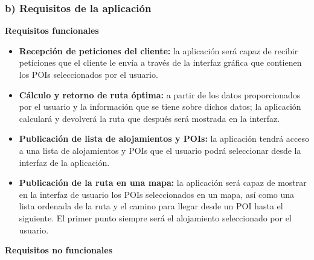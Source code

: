 \subsubsection[Requisitos internos]{b) Requisitos de la aplicación}
\textbf{Requisitos funcionales}
\begin{itemize}
	\item \textbf{Recepción de peticiones del cliente:} la aplicación será capaz de recibir peticiones que el cliente le envía a través de la interfaz gráfica que contienen los POIs seleccionados por el usuario.
	\item \textbf{Cálculo y retorno de ruta óptima:} a partir de los datos proporcionados por el usuario y la información que se tiene sobre dichos datos; la aplicación calculará y devolverá la ruta que después será mostrada en la interfaz.
	\item \textbf{Publicación de lista de alojamientos y POIs:} la aplicación tendrá acceso a una lista de alojamientos y POIs que el usuario podrá seleccionar desde la interfaz de la aplicación.
	\item \textbf{Publicación de la ruta en una mapa:} la aplicación será capaz de mostrar en la interfaz de usuario los POIs seleccionados en un mapa, así como una lista ordenada de la ruta y el camino para llegar desde un POI hasta el siguiente. El primer punto siempre será el alojamiento seleccionado por el usuario.
\end{itemize}
\textbf{Requisitos no funcionales}
